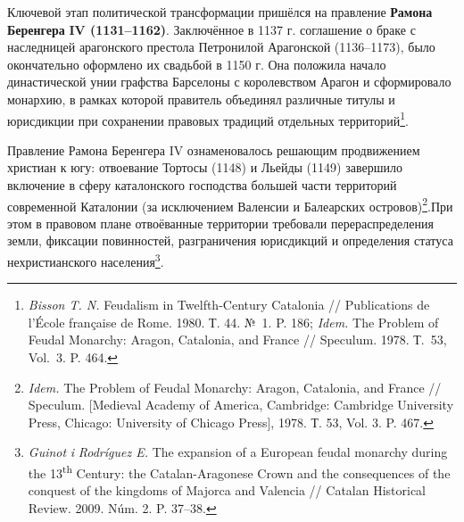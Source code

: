 Ключевой этап политической трансформации пришёлся на правление \textbf{Рамона }\textbf{Беренгера}\textbf{ IV (1131--1162)}. Заключённое в 1137 г. соглашение о браке с наследницей арагонского престола Петронилой Арагонской (1136--1173), было окончательно оформлено их свадьбой в 1150 г. Она положила начало династической унии графства Барселоны с королевством Арагон и сформировало монархию, в рамках которой правитель объединял различные титулы и юрисдикции при сохранении правовых традиций отдельных территорий\footnote{\emph{Bisson T. N.} Feudalism in Twelfth-Century Catalonia // Publications de l’École française de Rome. 1980. Т. 44. №~1. P. 186; \emph{Idem.} The Problem of Feudal Monarchy: Aragon, Catalonia, and France // Speculum. 1978. Т.~53, Vol.~3. P. 464.}.

Правление Рамона Беренгера IV ознаменовалось решающим продвижением христиан к югу: отвоевание Тортосы (1148) и Льейды (1149) завершило включение в сферу каталонского господства большей части территорий современной Каталонии (за исключением Валенсии и Балеарских островов)\footnote{\emph{Idem.} The Problem of Feudal Monarchy: Aragon, Catalonia, and France // Speculum. [Medieval Academy of America, Cambridge: Cambridge University Press, Chicago: University of Chicago Press], 1978. Т. 53, Vol. 3. P. 467.}.При этом в правовом плане отвоёванные территории требовали перераспределения земли, фиксации повинностей, разграничения юрисдикций и определения статуса нехристианского населения\footnote{\emph{Guinot }\emph{i}\emph{ Rodríguez E.} The expansion of a European feudal monarchy during the 13\textsuperscript{th} Century: the Catalan-Aragonese Crown and the consequences of the conquest of the kingdoms of Majorca and Valencia // Catalan Historical Review. 2009. Núm. 2. P. 37--38.}.

